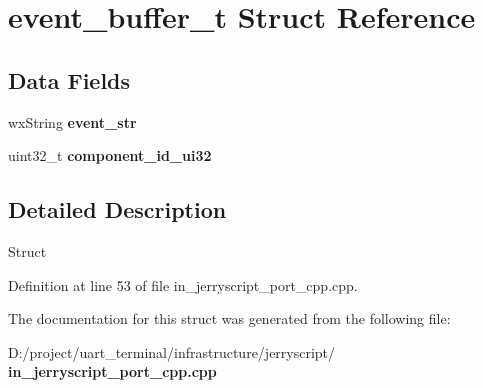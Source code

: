 \section{event\+\_\+buffer\+\_\+t Struct Reference}
\label{structevent__buffer__t}
\subsection*{Data Fields}
\begin{DoxyCompactItemize}
\item 
\mbox{\label{structevent__buffer__t_a43aba9d4f0f518678c2dd03b5bfd9e7e}} 
wx\+String {\bfseries event\+\_\+str}
\item 
\mbox{\label{structevent__buffer__t_ad4bf9ecdf3bd0d39395e33bb57de7cfa}} 
uint32\+\_\+t {\bfseries component\+\_\+id\+\_\+ui32}
\end{DoxyCompactItemize}


\subsection{Detailed Description}
Struct 

Definition at line 53 of file in\+\_\+jerryscript\+\_\+port\+\_\+cpp.\+cpp.



The documentation for this struct was generated from the following file\+:\begin{DoxyCompactItemize}
\item 
D\+:/project/uart\+\_\+terminal/infrastructure/jerryscript/\textbf{ in\+\_\+jerryscript\+\_\+port\+\_\+cpp.\+cpp}\end{DoxyCompactItemize}
